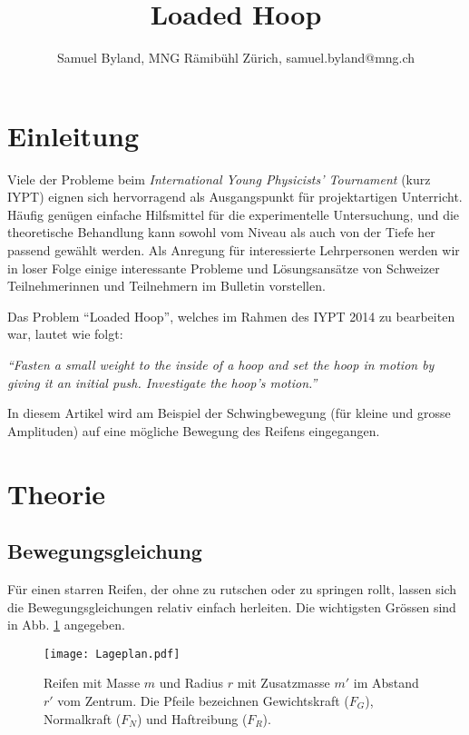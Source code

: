 \documentclass[11pt,a4paper]{article} %
\title{{\sffamily\bfseries Loaded Hoop}} %
\author{{\sffamily Samuel Byland, MNG Rämibühl Zürich, samuel.byland@mng.ch}} %
\date{} %
\begin{document}
\clearpage\maketitle %
\thispagestyle{empty} %

\section{Einleitung}

Viele der Probleme beim {\em International Young Physicists' Tournament} (kurz IYPT)  eignen sich hervorragend als Ausgangspunkt für projektartigen Unterricht. Häufig genügen einfache Hilfsmittel für die experimentelle Untersuchung, und die theoretische Behandlung kann sowohl vom Niveau als auch von der Tiefe her passend gewählt werden. Als Anregung für interessierte Lehrpersonen werden wir in loser Folge einige interessante Probleme und Lösungsansätze von Schweizer Teilnehmerinnen und Teilnehmern im Bulletin vorstellen.

Das Problem ``Loaded Hoop'', welches im Rahmen des IYPT 2014 zu bearbeiten war,  lautet wie folgt:

{\em ``Fasten a small weight to the inside of a hoop and set the hoop in motion by giving it an initial push. Investigate the hoop’s motion.''}

In diesem Artikel wird am Beispiel der Schwingbewegung (für kleine und grosse Amplituden) auf eine mögliche Bewegung des Reifens eingegangen.

\section{Theorie}

\subsection{Bewegungsgleichung}

Für einen starren Reifen, der ohne zu rutschen oder zu springen rollt, lassen sich die Bewegungsgleichungen relativ einfach herleiten. Die wichtigsten Grössen sind in Abb. \ref{fig:Reifen} angegeben.

\begin{figure}[H]
\texttt{[image: Lageplan.pdf]}
\caption{Reifen mit Masse $m$ und Radius $r$ mit Zusatzmasse $m'$ im Abstand $r'$ vom Zentrum. Die Pfeile bezeichnen Gewichtskraft ($F_G$), Normalkraft ($F_N$) und Haftreibung ($F_R$).}
\label{fig:Reifen}
\end{figure}
\end{document}
